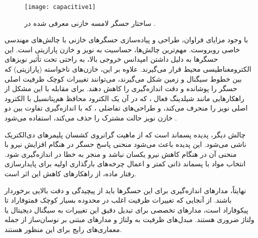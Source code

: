 	\begin{figure}[t]
	\centering
	\texttt{[image: capacitive1]}
	\caption{ساختار حسگر لامسه خازنی معرفی شده در
		\cite{pagoli2022large}.}
	\label{fig:CapStructure}
\end{figure}

با وجود مزایای فراوان، طراحی و پیاده‌سازی حسگرهای خازنی با چالش‌های مهندسی خاصی روبروست. مهم‌ترین چالش‌ها، حساسیت به نویز و خازن پارازیتی است. این حسگرها به دلیل داشتن امپدانس خروجی بالا، به راحتی تحت تأثیر نویزهای الکترومغناطیسی
  محیط قرار می‌گیرند. علاوه بر این، خازن‌های ناخواسته (پارازیتی) که بین خطوط سیگنال و زمین شکل می‌گیرند، می‌توانند تغییرات کوچک ظرفیت اصلی حسگر را پوشانده و دقت اندازه‌گیری را کاهش دهند. برای مقابله با این مشکل از راهکارهایی مانند شیلدینگ فعال
   ،
    که در آن یک الکترود محافظ هم‌پتانسیل با الکترود اصلی نویز را منحرف می‌کند، و طراحی‌های تفاضلی
    ،
  که با اندازه‌گیری تفاوت بین دو خازن نویز حالت مشترک را حذف می‌کند، استفاده می‌شود \cite{tiwana2012review}.

چالش دیگر، پدیده پسماند است که از ماهیت گرانروی کشسان 
پلیمرهای دی‌الکتریک ناشی می‌شود. این پدیده باعث می‌شود منحنی پاسخ حسگر در هنگام افزایش نیرو با منحنی آن در هنگام کاهش نیرو یکسان نباشد و منجر به خطا در اندازه‌گیری شود. انتخاب مواد با پسماند ذاتی کمتر و اعمال چرخه‌های بارگذاری اولیه برای پایدارسازی رفتار ماده، از راهکارهای کاهش این اثر است.

نهایتاً، مدارهای اندازه‌گیری برای این حسگرها باید از پیچیدگی و دقت بالایی برخوردار باشند. از آنجایی که تغییرات ظرفیت اغلب در محدوده بسیار کوچک فمتوفاراد تا پیکوفاراد  است، مدارهای تخصصی برای تبدیل دقیق این تغییرات به سیگنال دیجیتال یا ولتاژ ضروری هستند. مبدل‌های ظرفیت به ولتاژ 
 و مدارهای مبتنی بر نوسان‌ساز
از جمله معماری‌های رایج برای این منظور هستند.


